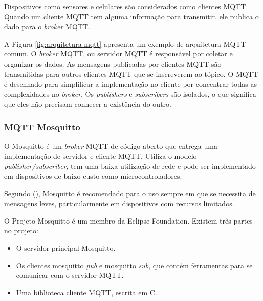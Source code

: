 \newpage

Dispositivos como sensores e celulares são considerados como clientes MQTT. Quando um cliente MQTT tem alguma informação para transmitir, ele publica o dado para o \textit {broker} MQTT.

A Figura \ref{fig:arquitetura-mqtt} apresenta um exemplo de arquitetura MQTT comum. O \textit {broker} MQTT, ou servidor MQTT é responsável por coletar e organizar os dados. As mensagens publicadas por clientes MQTT são transmitidas para outros clientes MQTT que se inscreverem ao tópico. O MQTT é desenhado para simplificar a implementação no cliente por concentrar todas as complexidades no \textit {broker}. Os \textit {publishers} e \textit {subscribers} são isolados, o que significa que eles não precisam conhecer a existência do outro.

\subsubsection{MQTT Mosquitto}

O Mosquitto é um \textit{broker} MQTT de código aberto \cite{Kodali2017} que entrega uma implementação de servidor e cliente MQTT. Utiliza o modelo \textit{publisher/subscriber}, tem uma baixa utilização de rede e pode ser implementado em dispositivos de baixo custo como microcontroladores. \cite{Light}

Segundo \citeauthor{Light} (\citeyear{Light}), Mosquitto é recomendado para o uso sempre em que se necessita de mensagens leves, particularmente em dispositivos com recursos limitados.

\newpage

O Projeto Mosquitto é um membro da Eclipse Foundation. Existem três partes no projeto:

\begin{itemize}
	\item O servidor principal Mosquitto.
	\item Os clientes mosquitto \textit{pub} e mosquitto \textit{sub}, que contém ferramentas para se comunicar com o servidor MQTT.
	\item Uma biblioteca cliente MQTT, escrita em C.
\end{itemize}

